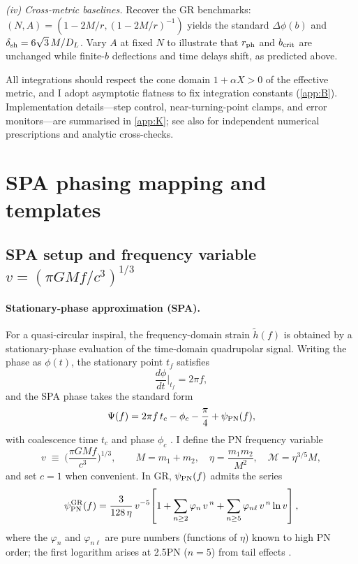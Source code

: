 \documentclass{iopjournal}
\begin{document}
\emph{(iv) Cross-metric baselines.} Recover the GR benchmarks: $(N,A)=(1-2M/r,(1-2M/r)^{-1})$ yields the standard $\Delta\phi(b)$ and $\delta_{\rm sh}=6\sqrt{3}\,M/D_L$. Vary $A$ at fixed $N$ to illustrate that $r_{\rm ph}$ and $b_{\rm crit}$ are unchanged while finite-$b$ deflections and time delays shift, as predicted above.

All integrations should respect the cone domain $1+\alpha X>0$ of the effective metric, and I adopt asymptotic flatness to fix integration constants (\cref{app:B}). Implementation details—step control, near-turning-point clamps, and error monitors—are summarised in \cref{app:K}; see also \cite{Perlick2004LRR,Bozza2002PRD} for independent numerical prescriptions and analytic cross-checks.


\section{SPA phasing mapping and templates}\label{app:E}
\subsection{\texorpdfstring{SPA setup and frequency variable $v=(\pi GM f/c^3)^{1/3}$}{SPA setup and the frequency variable v}}\label{app:E1}
\paragraph{Stationary-phase approximation (SPA).}
For a quasi-circular inspiral, the frequency-domain strain $\tilde h(f)$ is obtained by a stationary-phase evaluation of the time-domain quadrupolar signal. Writing the phase as $\phi(t)$, the stationary point $t_f$ satisfies
\[
\frac{d\phi}{dt}\Big|_{t_f}=2\pi f,
\]
and the SPA phase takes the standard form
\begin{equation}
\Psi(f)=2\pi f\,t_c-\phi_c-\frac{\pi}{4}+\psi_{\rm PN}(f),
\label{eq:E1_SPAphase}
\end{equation}
with coalescence time $t_c$ and phase $\phi_c$ \cite{CutlerFlanagan1994,SathyaprakashSchutz2009,Blanchet2014LRR,MaggioreGW}. I define the PN frequency variable
\begin{equation}
v\;\equiv\;\Big(\frac{\pi GM f}{c^3}\Big)^{1/3},
\qquad
M=m_1+m_2,\quad
\eta=\frac{m_1 m_2}{M^2},\quad
\mathcal{M}=\eta^{3/5}M,
\label{eq:E1_v_def}
\end{equation}
and set $c=1$ when convenient. In GR, $\psi_{\rm PN}(f)$ admits the series
\begin{equation}
\psi_{\rm PN}^{\rm GR}(f)=\frac{3}{128\,\eta}\,v^{-5}\!
\left[
1+\sum_{n\ge2}\varphi_n\,v^{\,n}
+\sum_{n\ge5}\varphi_{n\ell}\,v^{\,n}\ln v
\right],
\label{eq:E1_GRseries}
\end{equation}
where the $\varphi_n$ and $\varphi_{n\ell}$ are pure numbers (functions of $\eta$) known to high PN order; the first logarithm arises at 2.5PN ($n=5$) from tail effects \cite{Blanchet2014LRR,MaggioreGW}.
\end{document}
